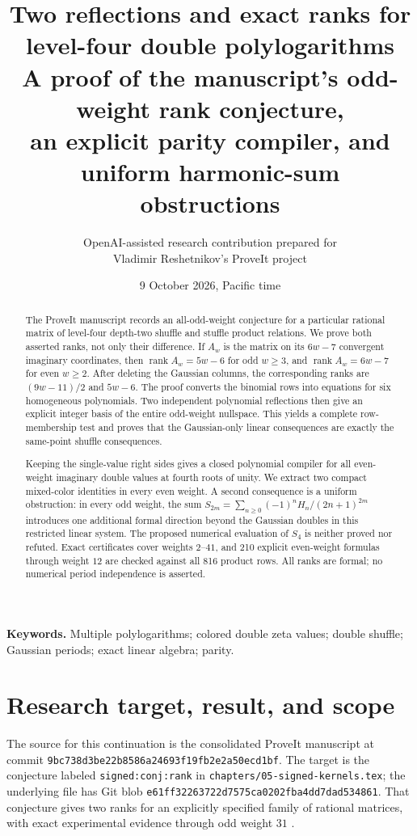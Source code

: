 \documentclass[11pt,a4paper]{article}
\title{\vspace{-9mm}\textbf{Two reflections and exact ranks for\\level-four double polylogarithms}\\[5pt]
\large A proof of the manuscript's odd-weight rank conjecture,\\an explicit parity compiler, and uniform harmonic-sum obstructions}
\author{OpenAI-assisted research contribution prepared for\\Vladimir Reshetnikov's ProveIt project}
\date{9 October 2026, Pacific time}
\numberwithin{equation}{section}
\theoremstyle{definition}\newtheorem{definition}[theorem]{Definition}
\theoremstyle{remark}\newtheorem{remark}[theorem]{Remark}
\newcommand{\rank}{\operatorname{rank}}
\newcommand{\pathtext}[1]{\nolinkurl{#1}}
\begin{document}
\maketitle
\begin{abstract}
The ProveIt manuscript records an all-odd-weight conjecture for a particular
rational matrix of level-four depth-two shuffle and stuffle product relations.
We prove both asserted ranks, not only their difference. If $A_w$ is the
matrix on its $6w-7$ convergent imaginary coordinates, then
$\rank A_w=5w-6$ for odd $w\ge3$, and $\rank A_w=6w-7$ for even $w\ge2$.
After deleting the Gaussian columns, the corresponding ranks are
$(9w-11)/2$ and $5w-6$. The proof converts the binomial rows into equations
for six homogeneous polynomials. Two independent polynomial reflections
then give an explicit integer basis of the entire odd-weight nullspace.
This yields a complete row-membership test and proves that the Gaussian-only
linear consequences are exactly the same-point shuffle consequences.

Keeping the single-value right sides gives a closed polynomial compiler for
all even-weight imaginary double values at fourth roots of unity. We extract
two compact mixed-color identities in every even weight. A second consequence
is a uniform obstruction: in every odd weight, the sum
$S_{2m}=\sum_{n\ge0}(-1)^nH_n/(2n+1)^{2m}$ introduces one additional formal
direction beyond the Gaussian doubles in this restricted linear system.
The proposed numerical evaluation of $S_4$ is neither proved nor refuted.
Exact certificates cover weights $2$--$41$, and 210 explicit even-weight
formulas through weight $12$ are checked against all 816 product rows.
All ranks are formal; no numerical period independence is asserted.
\end{abstract}
\vspace{3mm}
\noindent\textbf{Keywords.} Multiple polylogarithms; colored double zeta values;
double shuffle; Gaussian periods; exact linear algebra; parity.
\newpage
\tableofcontents
\newpage

\section{Research target, result, and scope}
\label{sec:scope}
The source for this continuation is the consolidated ProveIt manuscript at
commit \pathtext{9bc738d3be22b8586a24693f19fb2e2a50ecd1bf}. The target is the
conjecture labeled \pathtext{signed:conj:rank} in
\pathtext{chapters/05-signed-kernels.tex}; the underlying file has Git blob
\pathtext{e61ff32263722d7575ca0202fba4dd7dad534861}. That conjecture gives two
ranks for an explicitly specified family of rational matrices, with exact
experimental evidence through odd weight $31$ \cite{repo}.
\end{document}
